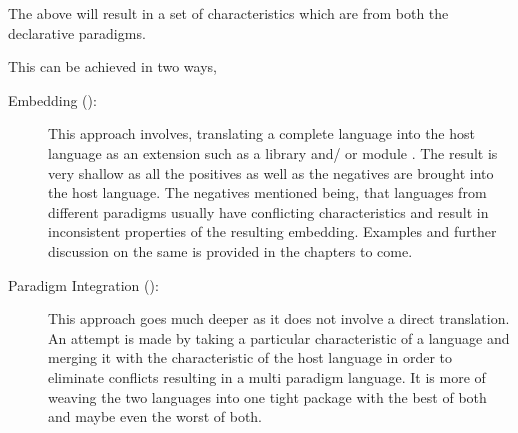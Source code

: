 \documentclass[thesis-solanki.tex]{subfiles}
\begin{document}
The above will result in a set of characteristics which are from both the declarative paradigms. 
   
This can be achieved in two ways,
\begin{description}
\item [Embedding ():]

\par This approach involves, translating a complete language into the host language as an extension such as a library and/ or module . The result is very 
shallow as all the positives as well as the negatives are brought into the host language. The negatives mentioned being, that languages from different 
paradigms usually have conflicting characteristics and result in inconsistent properties of the resulting embedding. Examples and further discussion on 
the same is provided in the chapters to come.  

\item [Paradigm Integration ():]

\par This approach goes much deeper as it does not involve a direct translation. An attempt is made by taking a particular characteristic of a language 
and merging it with the characteristic of the host language in order to eliminate conflicts resulting in a multi paradigm language. It is more of weaving 
the two languages into one tight package with the best of both and maybe even the worst of both.       
\end{description}


%



\end{document}

